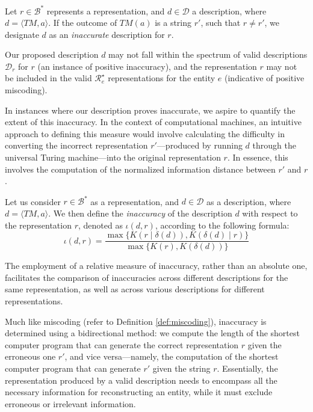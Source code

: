 \begin{definition}
Let $r \in \mathcal{B}^\ast$ represents a representation, and $d \in \mathcal{D}$ a description, where $d = \langle TM, a \rangle$. If the outcome of $TM(a)$ is a string $r'$, such that $r \neq r'$, we designate $d$ as an \emph{inaccurate} description for $r$.
\end{definition}

Our proposed description $d$ may not fall within the spectrum of valid descriptions $\mathcal{D}_r$ for $r$ (an instance of positive inaccuracy), and the representation $r$ may not be included in the valid $\mathcal{R}^\star_e$ representations for the entity $e$ (indicative of positive miscoding).

In instances where our description proves inaccurate, we aspire to quantify the extent of this inaccuracy. In the context of computational machines, an intuitive approach to defining this measure would involve calculating the difficulty in converting the incorrect representation $r'$—produced by running $d$ through the universal Turing machine—into the original representation $r$. In essence, this involves the computation of the normalized information distance between $r'$ and $r$.

\begin{definition} [Inaccuracy]
\label{def:inaccuracy:inaccuracy:inaccuracy}
Let us consider $r \in \mathcal{B}^\ast$ as a representation, and $d \in \mathcal{D}$ as a description, where $d = \langle TM, a \rangle$. We then define the \emph{inaccuracy} of the description $d$ with respect to the representation $r$, denoted as $\iota(d, r)$, according to the following formula:
\[
\iota(d, r) = \frac{ \max\{ K \left(r \mid \delta(d) \right), K \left( \delta(d) \mid r \right) \} } { \max\{ K(r), K \left(\delta(d) \right) \} }
\]
\end{definition}

The employment of a relative measure of inaccuracy, rather than an absolute one, facilitates the comparison of inaccuracies across different descriptions for the same representation, as well as across various descriptions for different representations.

Much like miscoding (refer to Definition \ref{def:miscoding}), inaccuracy is determined using a bidirectional method: we compute the length of the shortest computer program that can generate the correct representation $r$ given the erroneous one $r'$, and vice versa—namely, the computation of the shortest computer program that can generate $r'$ given the string $r$. Essentially, the representation produced by a valid description needs to encompass all the necessary information for reconstructing an entity, while it must exclude erroneous or irrelevant information. 

